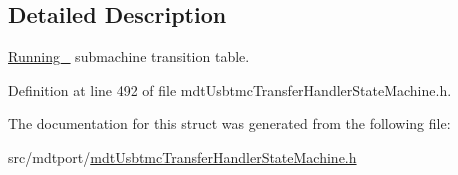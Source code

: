 \subsection{Detailed Description}
\hyperlink{structmdt_usbtmc_transfer_handler_state_machine_1_1_running__}{Running\-\_\-} submachine transition table. 

Definition at line 492 of file mdt\-Usbtmc\-Transfer\-Handler\-State\-Machine.\-h.



The documentation for this struct was generated from the following file\-:\begin{DoxyCompactItemize}
\item 
src/mdtport/\hyperlink{mdt_usbtmc_transfer_handler_state_machine_8h}{mdt\-Usbtmc\-Transfer\-Handler\-State\-Machine.\-h}\end{DoxyCompactItemize}
